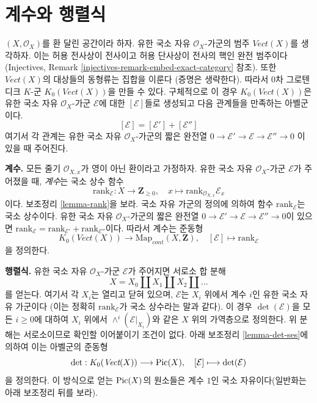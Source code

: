 \section{계수와 행렬식}
\label{section-rank-and-det}

\noindent
$(X, \mathcal{O}_X)$를 환 달린 공간이라 하자. 유한 국소 자유
$\mathcal{O}_X$-가군의 범주 $\textit{Vect}(X)$를 생각하자.
이는 허용 전사상이 전사이고 허용 단사상이 전사의 핵인 완전 범주이다
(Injectives, Remark \ref{injectives-remark-embed-exact-category} 참조).
또한 $\textit{Vect}(X)$의 대상들의 동형류는 집합을 이룬다
(증명은 생략한다). 따라서 0차 그로텐디크 $K$-군
$K_0(\textit{Vect}(X))$을 만들 수 있다.
구체적으로 이 경우 $K_0(\textit{Vect}(X))$은 유한 국소 자유
$\mathcal{O}_X$-가군 $\mathcal{E}$에 대한 $[\mathcal{E}]$들로
생성되고 다음 관계들을 만족하는 아벨군이다.
$$
[\mathcal{E}] = [\mathcal{E}'] + [\mathcal{E}'']
$$
여기서 각 관계는 유한 국소 자유 $\mathcal{O}_X$-가군의 짧은 완전열
$0 \to \mathcal{E}' \to \mathcal{E} \to \mathcal{E}'' \to 0$
이 있을 때 주어진다.

\medskip\noindent
{\bf 계수.} 모든 줄기 $\mathcal{O}_{X, x}$가 영이 아닌 환이라고
가정하자. 유한 국소 자유 $\mathcal{O}_X$-가군 $\mathcal{E}$가
주어졌을 때, {\it 계수}는 국소 상수 함수
$$
\text{rank}_\mathcal{E} : X \longrightarrow \mathbf{Z}_{\geq 0},\quad
x \longmapsto \text{rank}_{\mathcal{O}_{X, x}} \mathcal{E}_x
$$
이다. 보조정리 \ref{lemma-rank}을 보라. 국소 자유 가군의 정의에 의하여
함수 $\text{rank}_\mathcal{E}$는 국소 상수이다. 유한 국소 자유
$\mathcal{O}_X$-가군의 짧은 완전열
$0 \to \mathcal{E}' \to \mathcal{E} \to \mathcal{E}'' \to 0$이 있으면
$\text{rank}_\mathcal{E} = \text{rank}_{\mathcal{E}'} +
\text{rank}_{\mathcal{E}''}$이다.
따라서 계수는 준동형
$$
K_0(\textit{Vect}(X)) \longrightarrow \text{Map}_{cont}(X, \mathbf{Z}),\quad
[\mathcal{E}] \longmapsto \text{rank}_\mathcal{E}
$$
을 정의한다.

\medskip\noindent
{\bf 행렬식.} 유한 국소 자유 $\mathcal{O}_X$-가군
$\mathcal{E}$가 주어지면 서로소 합 분해
$$
X = X_0 \amalg X_1 \amalg X_2 \amalg \ldots
$$
를 얻는다. 여기서 각 $X_i$는 열리고 닫혀 있으며, $\mathcal{E}$는
$X_i$ 위에서 계수 $i$인 유한 국소 자유 가군이다
(이는 정확히 $\text{rank}_\mathcal{E}$가 국소 상수라는 말과 같다).
이 경우 $\det(\mathcal{E})$을 모든 $i \geq 0$에 대하여
$X_i$ 위에서 $\wedge^i(\mathcal{E}|_{X_i})$와 같은 $X$ 위의
가역층으로 정의한다. 위 분해는 서로소이므로 확인할 이어붙이기 조건이 없다.
아래 보조정리 \ref{lemma-det-ses}에 의하여 이는 아벨군의 준동형
$$
\det : K_0(\textit{Vect}(X)) \longrightarrow \mathop{\mathrm{Pic}}\nolimits(X),\quad
[\mathcal{E}] \longmapsto \det(\mathcal{E})
$$
을 정의한다. 이 방식으로 얻는 $\mathop{\mathrm{Pic}}\nolimits(X)$의 원소들은 계수 $1$인
국소 자유이다(일반화는 아래 보조정리 뒤를 보라).

